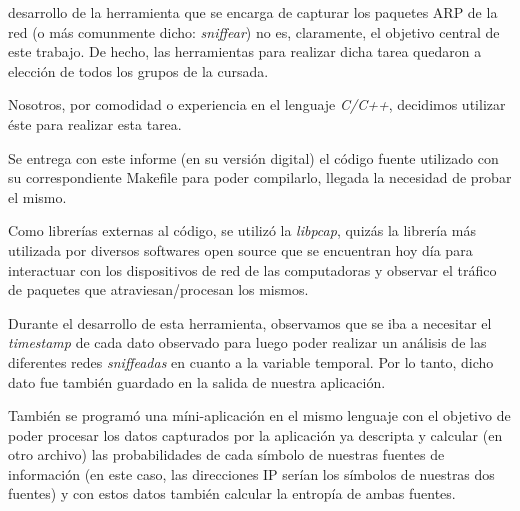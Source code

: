  desarrollo de la herramienta que se encarga de capturar
	los paquetes ARP de la red (o m\'as comunmente dicho: \textit{sniffear})
    no es, claramente, el objetivo central de este trabajo. De hecho, las
    herramientas para realizar dicha tarea quedaron a elecci\'on de todos
    los grupos de la cursada.
    
\par Nosotros, por comodidad o experiencia en el lenguaje \textit{C/C++},
	decidimos utilizar \'este para realizar esta tarea.
    
\par Se entrega con este informe (en su versi\'on digital) el c\'odigo
	fuente utilizado con su correspondiente Makefile para poder compilarlo,
    llegada la necesidad de probar el mismo.
    
\par Como librer\'ias externas al c\'odigo, se utiliz\'o la \textit{libpcap},
	quiz\'as la librer\'ia m\'as utilizada por diversos softwares open source
    que se encuentran hoy d\'ia para interactuar con los dispositivos de red
    de las computadoras y observar el tr\'afico de paquetes que atraviesan/procesan
    los mismos.
    
\par Durante el desarrollo de esta herramienta, observamos que se iba a necesitar
	el \textit{timestamp} de cada dato observado para luego poder realizar un
    an\'alisis de las diferentes redes \textit{sniffeadas} en cuanto a la variable
    temporal. Por lo tanto, dicho dato fue tambi\'en guardado en la salida de
    nuestra aplicaci\'on.
    
\par Tambi\'en se program\'o una m\'ini-aplicaci\'on en el mismo lenguaje con
	el objetivo de poder procesar los datos capturados por la aplicaci\'on ya
    descripta y calcular (en otro archivo) las probabilidades de cada s\'imbolo
    de nuestras fuentes de informaci\'on (en este caso, las direcciones IP ser\'ian
    los s\'imbolos de nuestras dos fuentes) y con estos datos tambi\'en calcular
    la entrop\'ia de ambas fuentes.